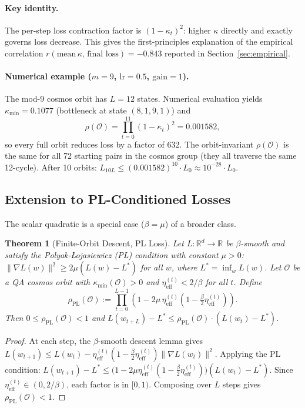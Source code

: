 \documentclass[11pt]{article}
\newtheorem{theorem}{Theorem}[section]
\theoremstyle{definition}
\theoremstyle{remark}
\newcommand{\etaeff}{\eta_{\mathrm{eff}}}
\newcommand{\kmin}{\kappa_{\min}}
\newcommand{\rhoO}{\rho(\mathcal{O})}
\newcommand{\rhoPL}{\rho_{\mathrm{PL}}(\mathcal{O})}
\begin{document}
\paragraph{Key identity.}
The per-step loss contraction factor is $(1-\kappa_t)^2$: higher $\kappa$ directly
and exactly governs loss decrease. This gives the first-principles explanation of
the empirical correlation $r(\text{mean}\,\kappa,\,\text{final loss})=-0.843$
reported in Section~\ref{sec:empirical}.

\paragraph{Numerical example ($m=9$, $\mathrm{lr}=0.5$, $\mathrm{gain}=1$).}
The mod-9 cosmos orbit has $L=12$ states. Numerical evaluation yields
$\kmin=0.1077$ (bottleneck at state $(8,1,9,1)$) and
\[
  \rhoO = \prod_{t=0}^{11}(1-\kappa_t)^2 = 0.001582,
\]
so every full orbit reduces loss by a factor of 632. The orbit-invariant $\rhoO$ is
the same for all 72 starting pairs in the cosmos group (they all traverse the same
12-cycle). After 10 orbits: $L_{10L}\leq(0.001582)^{10}\cdot L_0\approx 10^{-28}\cdot L_0$.

\subsection{Extension to PL-Conditioned Losses}
\label{sec:pl}

The scalar quadratic is a special case ($\beta=\mu$) of a broader class.

\begin{theorem}[Finite-Orbit Descent, PL Loss]
\label{thm:descent-pl}
Let $L:\mathbb{R}^d\to\mathbb{R}$ be $\beta$-smooth and satisfy the
Polyak-\L{}ojasiewicz (PL) condition with constant $\mu>0$:
$\|\nabla L(w)\|^2\geq 2\mu(L(w)-L^*)$ for all $w$,
where $L^*=\inf_w L(w)$. Let $\mathcal{O}$ be a QA cosmos orbit with
$\kmin(\mathcal{O})>0$ and $\etaeff^{(t)}<2/\beta$ for all $t$. Define
\[
  \rhoPL := \prod_{t=0}^{L-1}\!\left(1-2\mu\,\etaeff^{(t)}\!\left(1-\tfrac{\beta}{2}\etaeff^{(t)}\right)\right).
\]
Then $0\leq\rhoPL<1$ and
$L(w_{t+L})-L^*\leq\rhoPL\cdot(L(w_t)-L^*)$.
\end{theorem}

\begin{proof}
At each step, the $\beta$-smooth descent lemma gives
$L(w_{t+1})\leq L(w_t)-\etaeff^{(t)}(1-\tfrac{\beta}{2}\etaeff^{(t)})\|\nabla L(w_t)\|^2$.
Applying the PL condition:
$L(w_{t+1})-L^*\leq\bigl(1-2\mu\etaeff^{(t)}(1-\tfrac{\beta}{2}\etaeff^{(t)})\bigr)(L(w_t)-L^*)$.
Since $\etaeff^{(t)}\in(0,2/\beta)$, each factor is in $[0,1)$.
Composing over $L$ steps gives $\rhoPL<1$.
\end{proof}
\end{document}
